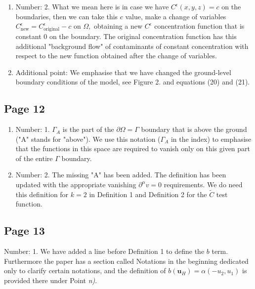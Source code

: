 \documentclass[11pt]{article}
\begin{document}
\begin{enumerate}

\item Number: 2. What we mean here is in case we have $C^\epsilon(x,y,z) = c$ on the boundaries, then we can take this $c$ value, make a change of variables $C^\epsilon_\text{new} = C^\epsilon_\text{original} - c$ on $\Omega,$ obtaining a new $C^\epsilon$ concentration function that is constant $0$ on the boundary. The original concentration function has this additional "background flow" of contaminants of constant concentration with respect to the new function obtained after the change of variables.

\item Additional point: We emphasise that we have changed the ground-level boundary conditions of the model, see Figure 2. and equations (20) and (21).

\end{enumerate}

\subsection{Page 12}

\begin{enumerate}

\item Number: 1. $\Gamma_A$ is the part of the $\partial \Omega = \Gamma$ boundary that is above the ground ("A" stands for "above"). We use this notation ($\Gamma_A$ in the index) to emphasise that the functions in this space are required to vanish only on this given part of the entire $\Gamma$ boundary.

\item Number: 2. The missing "A" has been added. The definition has been updated with the appropriate vanishing $\partial^\alpha v = 0$ requirements. We do need this definition for $k=2$ in Definition 1 and Definition 2 for the $\tilde{C}$ test function.

\end{enumerate}

\subsection{Page 13}

Number: 1. We have added a line before Definition 1 to define the $b$ term. Furthermore the paper has a section called Notations in the beginning dedicated only to clarify certain notations, and the definition of $b(\mathbf{u}_H) = \alpha (-u_2, u_1)$ is provided there under Point \textit{n)}.
\end{document}
